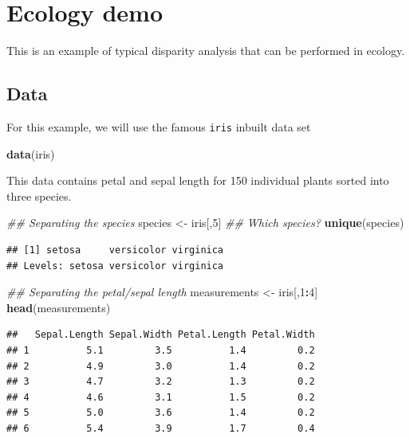 \documentclass[]{book}
\newenvironment{Shaded}{\begin{snugshade}}{\end{snugshade}}
\newcommand{\CommentTok}[1]{\textcolor[rgb]{0.56,0.35,0.01}{\textit{#1}}}
\newcommand{\DecValTok}[1]{\textcolor[rgb]{0.00,0.00,0.81}{#1}}
\newcommand{\KeywordTok}[1]{\textcolor[rgb]{0.13,0.29,0.53}{\textbf{#1}}}
\newcommand{\NormalTok}[1]{#1}
\newcommand{\OperatorTok}[1]{\textcolor[rgb]{0.81,0.36,0.00}{\textbf{#1}}}
\newcommand{\StringTok}[1]{\textcolor[rgb]{0.31,0.60,0.02}{#1}}
\begin{document}
\hypertarget{ecology-demo}{%
\chapter{Ecology demo}\label{ecology-demo}}

This is an example of typical disparity analysis that can be performed in ecology.

\hypertarget{data}{%
\section{Data}\label{data}}

For this example, we will use the famous \texttt{iris} inbuilt data set

\begin{Shaded}
\begin{Highlighting}[]
\KeywordTok{data}\NormalTok{(iris)}
\end{Highlighting}
\end{Shaded}

This data contains petal and sepal length for 150 individual plants sorted into three species.

\begin{Shaded}
\begin{Highlighting}[]
\CommentTok{## Separating the species}
\NormalTok{species <-}\StringTok{ }\NormalTok{iris[,}\DecValTok{5}\NormalTok{]}
\CommentTok{## Which species?}
\KeywordTok{unique}\NormalTok{(species)}
\end{Highlighting}
\end{Shaded}

\begin{verbatim}
## [1] setosa     versicolor virginica 
## Levels: setosa versicolor virginica
\end{verbatim}

\begin{Shaded}
\begin{Highlighting}[]
\CommentTok{## Separating the petal/sepal length}
\NormalTok{measurements <-}\StringTok{ }\NormalTok{iris[,}\DecValTok{1}\OperatorTok{:}\DecValTok{4}\NormalTok{]}
\KeywordTok{head}\NormalTok{(measurements)}
\end{Highlighting}
\end{Shaded}

\begin{verbatim}
##   Sepal.Length Sepal.Width Petal.Length Petal.Width
## 1          5.1         3.5          1.4         0.2
## 2          4.9         3.0          1.4         0.2
## 3          4.7         3.2          1.3         0.2
## 4          4.6         3.1          1.5         0.2
## 5          5.0         3.6          1.4         0.2
## 6          5.4         3.9          1.7         0.4
\end{verbatim}
\end{document}
